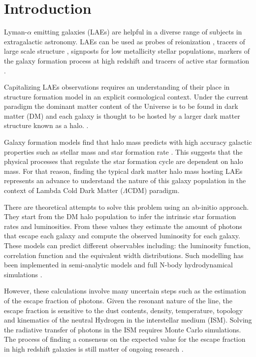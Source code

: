 \documentclass{emulateapj}
\newcommand{\ly}{{\ifmmode{{\rm Ly}\alpha}\else{Ly$\alpha$~}\fi}}
\begin{document}
\section{Introduction}

Lyman-$\alpha$ emitting galaxies (LAEs) are helpful in a diverse range
of subjects in extragalactic astronomy. LAEs can be
used as probes of reionization \citep{Dijkstra11}, tracers of large
scale structure \citep{Koehler2007},  signposts for low metallicity
stellar populations, markers of the galaxy formation process at high
redshift \citep{Dayal2009,ForeroRomero2012} and tracers of active star
formation \citep{Guaita2013}. 

Capitalizing LAEs observations requires an understanding of
their place in structure formation model in an explicit cosmological
context. Under the current paradigm the dominant matter content of the
Universe is to be found in dark matter (DM) and each galaxy is thought
to be hosted by a larger dark matter structure known as a
halo. \citep{Peebles1980,SpringelNature05}.  

Galaxy formation models find that halo mass predicts with high
accuracy galactic properties such as stellar mass and star formation
rate \citep{Behroozi2013a}. This suggests that the
physical processes that regulate the star formation cycle are 
dependent on halo mass.  For that reason, finding the typical dark
matter halo mass hosting LAEs represents an advance to understand the
nature of this galaxy population in the context of Lambda Cold Dark
Matter ($\Lambda$CDM) paradigm.  

There are theoretical attempts to solve this problem using an  ab-initio
approach. They start from the DM halo population to infer the
intrinsic star formation rates and \ly  luminosities. From these
values they estimate the amount of \ly photons that
escape each galaxy and compute the observed luminosity for each
galaxy. These models can predict different observables including: the
luminosity function, correlation function and the equivalent width
distributions. Such modelling has been implemented in semi-analytic
models \citep{Garel2012,Orsi2012} and  full N-body
hydrodynamical simulations \citep{Laursen2007, Dayal2009,
  ForeroRomero2011, Yajima2012}. 

However, these calculations involve many uncertain steps such as 
the estimation of the escape fraction of \ly photons. Given the resonant
nature of the \ly line, the escape fraction is sensitive to  the dust
contents, density, temperature, topology and kinematics of the neutral
Hydrogen in the interstellar medium (ISM). Solving the radiative
transfer of \ly photons in the ISM requires Monte Carlo
simulations. The process of finding a consensus on the expected value
for the \ly escape fraction in high redshift galaxies is still matter
of ongoing research
\citep{Neufeld1991,Verhamme2006,ForeroRomero2011,Dijkstra2012,Laursen2013,Orsi2012}.
\end{document}
